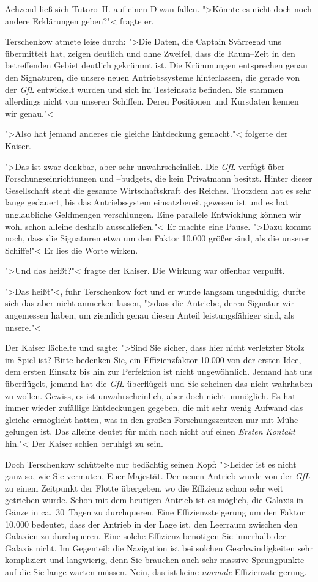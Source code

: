 \documentclass[11pt,twoside,openany]{scrbook}
\begin{document}
Ächzend ließ sich Tutoro~II. auf einen Diwan fallen. ">Könnte es nicht doch noch andere Erklärungen geben?"< fragte er.

Terschenkow atmete leise durch: ">Die Daten, die Captain Svårregad uns übermittelt hat, zeigen deutlich und ohne Zweifel, dass die Raum--Zeit in den betreffenden Gebiet deutlich gekrümmt ist. Die Krümmungen entsprechen genau den Signaturen, die unsere neuen Antriebssysteme hinterlassen, die gerade von der \emph{GfL} entwickelt wurden und sich im Testeinsatz befinden. Sie stammen allerdings nicht von unseren Schiffen. Deren Positionen und Kursdaten kennen wir genau."<

">Also hat jemand anderes die gleiche Entdeckung gemacht."< folgerte der Kaiser.

">Das ist zwar denkbar, aber sehr unwahrscheinlich. Die \emph{GfL} verfügt über Forschungseinrichtungen und --budgets, die kein Privatmann besitzt. Hinter dieser Gesellschaft steht die gesamte Wirtschaftskraft des Reiches. Trotzdem hat es sehr lange gedauert, bis das Antriebssystem einsatzbereit gewesen ist und es hat unglaubliche Geldmengen verschlungen. Eine parallele Entwicklung können wir wohl schon alleine deshalb ausschließen."< Er machte eine Pause. ">Dazu kommt noch, dass die Signaturen etwa um den Faktor 10.000 größer sind, als die unserer Schiffe!"< Er lies die Worte wirken.

">Und das heißt?"< fragte der Kaiser. Die Wirkung war offenbar verpufft.

">Das heißt"<, fuhr Terschenkow fort und er wurde langsam ungeduldig, durfte sich das aber nicht anmerken lassen, ">dass die Antriebe, deren Signatur wir angemessen haben, um ziemlich genau diesen Anteil leistungsfähiger sind, als unsere."<

Der Kaiser lächelte und sagte: ">Sind Sie sicher, dass hier nicht verletzter Stolz im Spiel ist? Bitte bedenken Sie, ein Effizienzfaktor 10.000 von der ersten Idee, dem ersten Einsatz bis hin zur Perfektion ist nicht ungewöhnlich. Jemand hat uns überflügelt, jemand hat die \emph{GfL} überflügelt und Sie scheinen das nicht wahrhaben zu wollen. Gewiss, es ist unwahrscheinlich, aber doch nicht unmöglich. Es hat immer wieder zufällige Entdeckungen gegeben, die mit sehr wenig Aufwand das gleiche ermöglicht hatten, was in den großen Forschungszentren nur mit Mühe gelungen ist. Das alleine deutet für mich noch nicht auf einen \emph{Ersten Kontakt} hin."< Der Kaiser schien beruhigt zu sein.

Doch Terschenkow schüttelte nur bedächtig seinen Kopf: ">Leider ist es nicht ganz so, wie Sie vermuten, Euer Majestät. Der neuen Antrieb wurde von der \emph{GfL} zu einem Zeitpunkt der Flotte übergeben, wo die Effizienz schon sehr weit getrieben wurde. Schon mit dem heutigen Antrieb ist es möglich, die Galaxis in Gänze in ca.~30~Tagen zu durchqueren. Eine Effizienzsteigerung um den Faktor 10.000 bedeutet, dass der Antrieb in der Lage ist, den Leerraum zwischen den Galaxien zu durchqueren. Eine solche Effizienz benötigen Sie innerhalb der Galaxis nicht. Im Gegenteil: die Navigation ist bei solchen Geschwindigkeiten sehr kompliziert und langwierig, denn Sie brauchen auch sehr massive Sprungpunkte auf die Sie lange warten müssen. Nein, das ist keine \emph{normale} Effizienzsteigerung.
\end{document}
